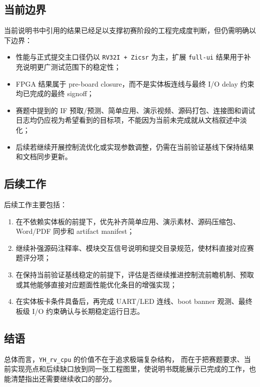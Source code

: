 \subsection{当前边界}

当前说明书中引用的结果已经足以支撑初赛阶段的工程完成度判断，但仍需明确以下边界：
\begin{itemize}
    \item 性能与正式提交主口径仍以 \texttt{RV32I + Zicsr} 为主，扩展 \texttt{full-ui} 结果用于补充说明更广测试范围下的稳定性；
    \item FPGA 结果属于 pre-board closure，而不是实体板连线与最终 I/O delay 约束均已完成的最终 signoff；
    \item 赛题中提到的 IF 预取/预测、简单应用、演示视频、源码打包、连接图和调试日志均仍应视为希望看到的目标项，不能因为当前未完成就从文档叙述中淡化；
    \item 后续若继续开展控制流优化或实现参数调整，仍需在当前验证基线下保持结果和文档同步更新。
\end{itemize}

\subsection{后续工作}

后续工作主要包括：
\begin{enumerate}
    \item 在不依赖实体板的前提下，优先补齐简单应用、演示素材、源码压缩包、Word/PDF 同步和 artifact manifest；
    \item 继续补强源码注释率、模块交互信号说明和提交目录规范，使材料直接对应赛题评分项；
    \item 在保持当前验证基线稳定的前提下，评估是否继续推进控制流前瞻机制、预取或其他能够直接对应题面性能优化条目的增强实现；
    \item 在实体板卡条件具备后，再完成 UART/LED 连线、boot banner 观测、最终板级 I/O 约束确认与长期稳定运行日志。
\end{enumerate}

\subsection{结语}

总体而言，\texttt{YH\_rv\_cpu} 的价值不在于追求极端复杂结构，
而在于把赛题要求、当前实现亮点和后续缺口放到同一张工程图里，使说明书既能展示已完成的工作，也能清楚指出还需要继续收口的部分。
